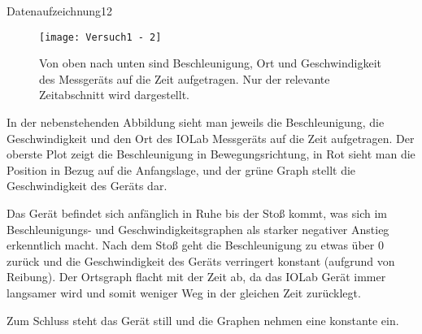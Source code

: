\documentclass{alex_gp}
\begin{document}
\begin{myfigure}{Datenaufzeichnung}{12}
	\begin{wrapfigure}{r}{0.5\textwidth}
			\vspace{-1em}
			\texttt{[image: Versuch1 - 2]}
			\caption{Von oben nach unten sind Beschleunigung, Ort und Geschwindigkeit des Messgeräts auf die Zeit aufgetragen. Nur der relevante Zeitabschnitt wird dargestellt.}
	\end{wrapfigure}
	In der nebenstehenden Abbildung sieht man jeweils die Beschleunigung, die Geschwindigkeit und den Ort des IOLab Messgeräts auf die Zeit aufgetragen. 
	Der oberste Plot zeigt die Beschleunigung in Bewegungsrichtung, in Rot sieht man die Position in Bezug auf die Anfangslage, und der grüne Graph stellt die Geschwindigkeit des Geräts dar. \par
	
	\indent Das Gerät befindet sich anfänglich in Ruhe bis der Stoß kommt, was sich im Beschleunigungs- und Geschwindigkeitsgraphen als starker negativer Anstieg erkenntlich macht. 
	Nach dem Stoß geht die Beschleunigung zu etwas über 0 zurück und die Geschwindigkeit des Geräts verringert konstant (aufgrund von Reibung). Der Ortsgraph flacht mit der Zeit ab, da das IOLab Gerät immer langsamer wird und somit weniger Weg in der gleichen Zeit zurücklegt. \par
	
	Zum Schluss steht das Gerät still und die Graphen nehmen eine konstante ein.
\end{myfigure}
\end{document}
